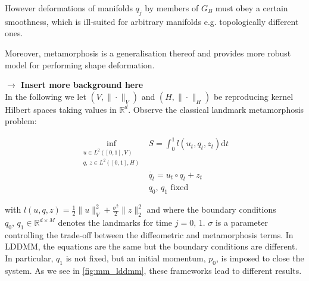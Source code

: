 \documentclass{article}
\newcommand{\half}{\frac 12}
\newcommand{\norm}[2]{\| #1 \|_{ #2 }}
\newcommand{\vnorm}[1]{\norm{ #1 }{V}}
\newcommand{\hnorm}[1]{\norm{ #1 }{H}}
\newcommand{\ltwonorm}[1]{\norm{ #1 }{2}}
\newcommand{\diff}[1]{\text{d} #1}
\newcommand{\Rd}{\mathbb{R}^{d}}
\newcommand{\RdM}{\mathbb{R}^{d\times M}}
\begin{document}
However deformations of manifolds $q_j$ by members of $G_B$ must obey a certain
smoothness, which is ill-suited for arbitrary manifolds e.g. topologically
different ones.

Moreover, metamorphosis is a generalisation thereof and provides more robust
model for performing shape deformation.

\textbf{$\longrightarrow$ Insert more background here}\\

In the following we let $(V,\vnorm{\cdot})$ and $(H,\hnorm{\cdot})$ be
reproducing kernel Hilbert spaces taking values in $\Rd$. Observe the classical
landmark metamorphosis problem: 

\begin{subequations}
\begin{align}
\inf_{\substack{u\in L^2([0,1],V)\\q,\, z \in L^2([0,1],H)}} & S = \int_0^1
l(u_t, q_t, z_t)\diff{t}\\
    & \dot{q_t} = u_t \circ q_t + z_t \\
    & q_0,\,q_1\text{ fixed}
\end{align}
\end{subequations}

with $l(u, q, z) = \half \vnorm{u}^2 + \frac{\sigma^2}2 \ltwonorm{z}^2$ and
where the boundary conditions $q_0,\,q_1 \in \RdM$ denotes the landmarks for
time $j=0,\,1$.  $\sigma$ is a parameter controlling the trade-off between the
diffeometric and metamorphosis terms. In LDDMM, the equations are the same but
the boundary conditions are different.  In particular, $q_1$ is not fixed, but
an initial momentum, $p_0$, is imposed to close the system. As we see in
\ref{fig:mm_lddmm}, these frameworks lead to different results.
\end{document}
